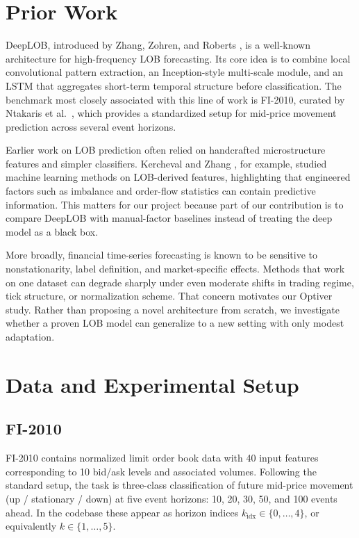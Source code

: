\documentclass[11pt]{article}
\begin{document}
\section{Prior Work}
DeepLOB, introduced by Zhang, Zohren, and Roberts \cite{zhang2019deeplob}, is a well-known architecture for high-frequency LOB forecasting. Its core idea is to combine local convolutional pattern extraction, an Inception-style multi-scale module, and an LSTM that aggregates short-term temporal structure before classification. The benchmark most closely associated with this line of work is FI-2010, curated by Ntakaris et al.~\cite{ntakaris2018benchmark}, which provides a standardized setup for mid-price movement prediction across several event horizons.

Earlier work on LOB prediction often relied on handcrafted microstructure features and simpler classifiers. Kercheval and Zhang \cite{kercheval2015modelling}, for example, studied machine learning methods on LOB-derived features, highlighting that engineered factors such as imbalance and order-flow statistics can contain predictive information. This matters for our project because part of our contribution is to compare DeepLOB with manual-factor baselines instead of treating the deep model as a black box.

More broadly, financial time-series forecasting is known to be sensitive to nonstationarity, label definition, and market-specific effects. Methods that work on one dataset can degrade sharply under even moderate shifts in trading regime, tick structure, or normalization scheme. That concern motivates our Optiver study. Rather than proposing a novel architecture from scratch, we investigate whether a proven LOB model can generalize to a new setting with only modest adaptation.

\section{Data and Experimental Setup}
\subsection{FI-2010}
FI-2010 contains normalized limit order book data with 40 input features corresponding to 10 bid/ask levels and associated volumes. Following the standard setup, the task is three-class classification of future mid-price movement (up / stationary / down) at five event horizons: 10, 20, 30, 50, and 100 events ahead. In the codebase these appear as horizon indices $k_\text{idx}\in\{0,\dots,4\}$, or equivalently $k\in\{1,\dots,5\}$.
\end{document}
